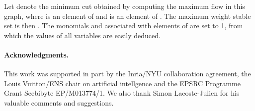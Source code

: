 \documentclass[10pt,twocolumn,letterpaper]{article}
\numberwithin{theorem}{section}
\begin{document}
Let  denote the minimum cut obtained by computing the
maximum flow in this graph, where  is an element of  and  is
an element of . The maximum weight stable set
is then . The monomials 
and  associated with elements of  are set to 1, from
which the values of all variables are easily deduced.
\vspace{-2mm} \vspace{-2mm}
\paragraph{Acknowledgments.} This work was supported in part by the Inria/NYU collaboration agreement, the Louis Vuitton/ENS chair on artificial intellgence and the EPSRC Programme Grant Seebibyte EP/M013774/1. We also thank Simon Lacoste-Julien for his valuable comments and suggestions.
\end{document}
